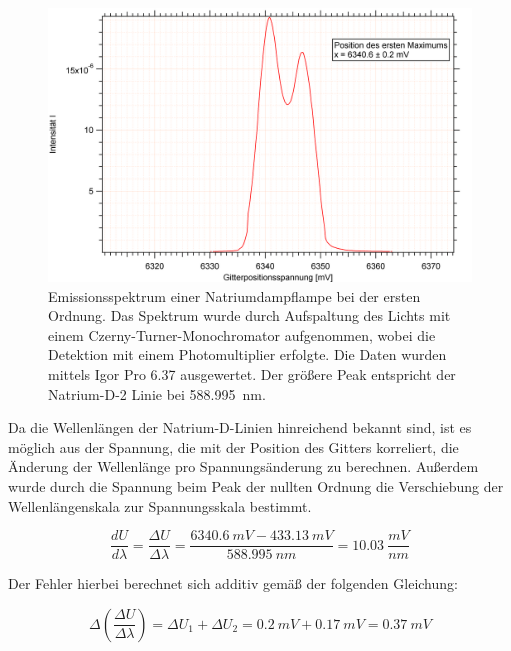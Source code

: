 \begin{figure}[H]
	\centering	
	\begin{minipage}{1\textwidth}
	\includegraphics[width=\columnwidth]{Bilder/Graph2.png}
	\end{minipage}
	
	
	\caption{Emissionsspektrum einer Natriumdampflampe bei der ersten Ordnung. Das Spektrum wurde durch Aufspaltung des Lichts mit einem Czerny-Turner-Monochromator aufgenommen, wobei die Detektion mit einem Photomultiplier erfolgte. Die Daten wurden mittels Igor Pro 6.37 ausgewertet. Der größere Peak entspricht der Natrium-D-2 Linie bei 588.995~\si{nm}.}
	
	
	\label{Eins}
\end{figure}



Da die Wellenlängen der Natrium-D-Linien hinreichend bekannt sind, ist es möglich aus der Spannung, die mit der Position des Gitters korreliert, die Änderung der Wellenlänge pro Spannungsänderung zu berechnen.\cite{lit} Außerdem wurde durch die Spannung beim Peak der nullten Ordnung die Verschiebung der Wellenlängenskala zur Spannungsskala bestimmt.

\begin {equation}
\frac{dU}{d\lambda}=\frac{\Delta U}{\Delta\lambda}=\frac{6340.6~\si{mV} - 433.13~\si{mV}}{588.995~\si{nm}}=10.03~\si{\frac{mV}{nm}} 
\end {equation}

Der Fehler hierbei berechnet sich additiv gemäß der folgenden Gleichung:

\begin {equation}
\Delta\left(\frac{\Delta U}{\Delta \lambda}\right) = \Delta U_1 + \Delta U_2 = 0.2~\si{mV}+0.17~\si{mV}=0.37~\si{mV}
\end{equation}

